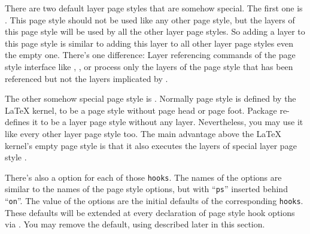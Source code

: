 \begin{Declaration}
\end{Declaration}
There are two default layer page styles that are somehow special. The first
one is . This page style should not be used like any
other page style, but the layers of this page style will be used by all the
other layer page styles. So adding a layer to this page style is similar to
adding this layer to all other layer page styles even the empty one. There's
one difference: Layer referencing commands of the page style interface like
, , or
 process only the layers of the page
style that has been referenced but not the layers implicated by
.

The other somehow special page style is . Normally page style
 is defined by the \LaTeX{} kernel, to be a page style
without page head or page foot. Package  re-defines it to be
a layer page style without any layer. Nevertheless, you may use it like every
other layer page style too. The main advantage above the \LaTeX{} kernel's
empty page style is that it also executes the layers of special layer page
style .%
\EndIndexGroup


\begin{Declaration}
\end{Declaration}
There's also a \KOMAScript{} option for each of those \texttt{hooks}. The
names of the \KOMAScript{} options are similar to the names of the page style
options, but with ``\texttt{ps}'' inserted behind ``\texttt{on}''. The value
of the \KOMAScript{} options are the initial defaults of the corresponding
\texttt{hooks}. These defaults will be extended at every declaration of page
style hook options via . You may remove the default, using
 described later in this section.%
\EndIndexGroup


